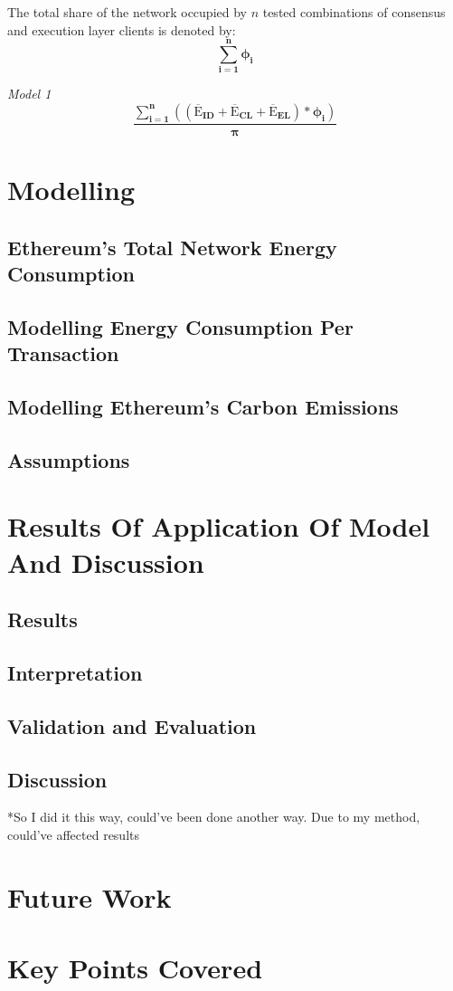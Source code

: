 The total share of the network occupied by ${n}$ tested combinations of consensus and execution layer clients is denoted by:
\begin{equation*}
    \boldsymbol{\displaystyle\sum\limits_{i=1}^{n}{\phi_{i}}}
\end{equation*}

\textit{Model 1}
\begin{equation}
\boldsymbol{\frac{\displaystyle\sum\limits_{i=1}^{n}{ \left({\left(\mathrm{\overline{E}}_{ID} + \mathrm{\overline{E}}_{CL} + \mathrm{\overline{E}}_{EL}\right)} * {\phi_{i}} \right)}}
 {\pi}}
\end{equation}





\section {Modelling }
\subsection{Ethereum's Total Network Energy Consumption}
\subsection {Modelling Energy Consumption Per Transaction}
\subsection {Modelling Ethereum's Carbon Emissions}
\subsection{Assumptions}
\section{Results Of Application Of Model And Discussion}
\subsection{Results}
\subsection{Interpretation}
\subsection{Validation and Evaluation}

\subsection{Discussion}
*So I did it this way, could've been done another way. Due to my method, could've affected results

\section{Future Work}
\section{Key Points Covered}
